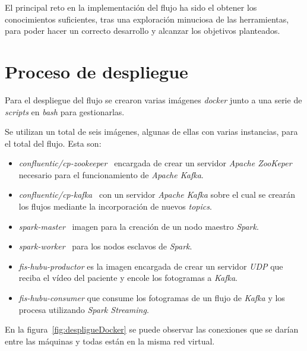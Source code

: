 El principal reto en la implementación del flujo ha sido el obtener los conocimientos suficientes, tras una exploración minuciosa de las herramientas, para poder hacer un correcto desarrollo y alcanzar los objetivos planteados.


\section{Proceso de despliegue}

Para el despliegue del flujo se crearon varias imágenes \textit{docker} junto a una serie de \textit{scripts} en \textit{bash} para gestionarlas.

Se utilizan un total de seis imágenes, algunas de ellas con varias instancias, para el total del flujo. Esta son:

\begin{itemize}
	\item \textit{confluentic/cp-zookeeper}~\cite{confluentic2020docker} encargada de crear un servidor \textit{Apache ZooKeper} necesario para el funcionamiento de \textit{Apache Kafka}.
	\item \textit{confluentic/cp-kafka}~\cite{confluentic2020docker} con un servidor \textit{Apache Kafka} sobre el cual se crearán los flujos mediante la incorporación de nuevos \textit{topics}.
	\item \textit{spark-master}~\cite{juez2019docker} imagen para la creación de un nodo maestro \textit{Spark}.
	\item \textit{spark-worker}~\cite{juez2019docker} para los nodos esclavos de \textit{Spark}.
	\item \textit{fis-hubu-productor} es la imagen encargada de crear un servidor \textit{UDP} que reciba el vídeo del paciente y encole los fotogramas a \textit{Kafka}.
	\item \textit{fis-hubu-consumer} que consume los fotogramas de un flujo de \textit{Kafka} y los procesa utilizando \textit{Spark Streaming}.
\end{itemize}

En la figura~\ref{fig:despligueDocker} se puede observar las conexiones que se darían entre las máquinas y todas están en la misma red virtual.

